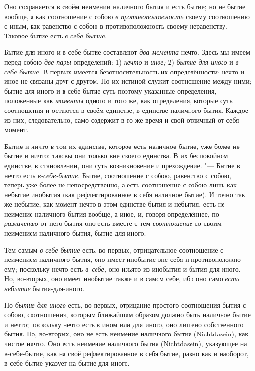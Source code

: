 Оно сохраняется в своём неимении наличного бытия и есть бытие; но не бытие
вообще, а как соотношение с собою {\em в
противоположность} своему соотношению с иным, как равенство с собою в
противоположность своему неравенству. Таковое бытие есть
{\em в-себе-бытие}.

Бытие-для-иного и в-себе-бытие составляют {\em два
момента} нечто. Здесь мы имеем перед собою {\em две
пары} определений: 1) {\em нечто} и
{\em иное;} 2) {\em бытие-для-иного} и {\em в-себе-бытие}. В первых имеется
безотносительность их определённости: нечто и иное не связаны друг с
другом. Но их истиной служит соотношение между ними; бытие-для-иного и
в-себе-бытие суть поэтому указанные определения, положенные как
{\em моменты} одного и того же, как определения,
которые суть соотношения и остаются в своём единстве, в единстве наличного
бытия. Каждое из них, следовательно, само содержит в то же время
и свой отличный от себя момент.

Бытие и ничто в том их единстве, которое есть наличное бытие, уже более не
бытие и ничто: таковы они только вне своего единства. В их беспокойном
единстве, в становлении, они суть возникновение и прехождение. "--- Бытие в
нечто есть {\em в-себе-бытие}. Бытие, соотношение с
собою, равенство с собою, теперь уже более не непосредственно, а есть
соотношение с собою лишь как небытие инобытия (как рефлектированное в себя
наличное бытие). И точно так же небытие, как момент нечто в этом единстве
бытия и небытия, есть не неимение наличного бытия вообще, а иное, и,
говоря определённее, по {\em различению} от него бытия
оно есть вместе с тем {\em соотношение} со своим
неимением наличного бытия, бытие-для-иного.

Тем самым {\em в-себе-бытие} есть, во-первых,
отрицательное соотношение с неимением наличного бытия, оно имеет инобытие
вне себя и противоположно ему; поскольку нечто есть
{\em в~себе,} оно изъято из инобытия и бытия-для-иного.
Но, во-вторых, оно имеет инобытие также и в самом себе, ибо оно
само {\em есть небытие} бытия-для-иного.

Но {\em бытие-для-иного} есть, во-первых, отрицание
простого соотношения бытия с собою, соотношения, которым ближайшим образом
должно быть наличное бытие и нечто; поскольку нечто есть в ином
или для иного, оно лишено собственного бытия. Но, во-вторых,
оно не есть неимение наличного бытия (Nicht\-dasein), как чистое ничто. Оно
есть неимение наличного бытия (Nicht\-dasein), указующее на в-себе-бытие, как
на своё рефлектированное в себя бытие, равно как и наоборот, в-себе-бытие
указует на бытие-для-иного.

